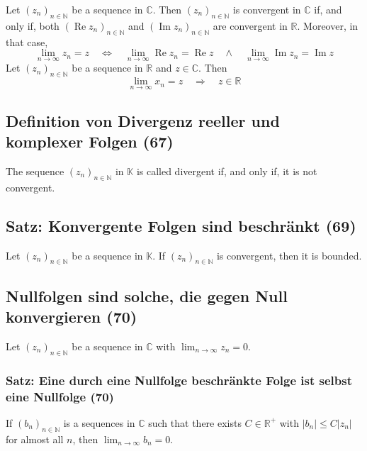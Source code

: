 Let $(z _ { n }) _ { n \in \mathbb { N } }$ be a sequence in $\mathbb{C}$. Then $(z _ { n }) _ { n \in \mathbb { N } }$ is convergent in $\mathbb{C}$
if, and only if, both $(\operatorname{Re}z _ { n }) _ { n \in \mathbb { N } }$ and $(\operatorname{Im}z _ { n }) _ { n \in \mathbb { N } }$ are convergent in $\mathbb{R}$. Moreover, in
that case,
\begin{equation}
\lim _ { n \rightarrow \infty } z _ { n } = z \quad \Leftrightarrow \quad \lim _ { n \rightarrow \infty } \operatorname{Re} z _ { n } = \operatorname{Re} z \quad \wedge \quad \lim  _ { n \rightarrow \infty } \operatorname{Im} z _ { n } = \operatorname{Im} z
\end{equation}
Let $(z _ { n }) _ { n \in \mathbb { N } }$ be a sequence in $\mathbb{R}$ and $z \in \mathbb{C}$. Then
\begin{equation}
\lim _ { n \rightarrow \infty } x _ { n } = z \quad \Rightarrow \quad z \in \mathbb { R }
\end{equation}

\subsection{Definition von Divergenz reeller und komplexer Folgen (67)}
The sequence $(z _ { n }) _ { n \in \mathbb { N } }$ in $\mathbb{K}$ is called divergent if, and only if, it is not convergent.

\subsection{Satz: Konvergente Folgen sind beschränkt (69)}
Let $(z _ { n }) _ { n \in \mathbb { N } }$ be a sequence in $\mathbb{K}$. If  $(z _ { n }) _ { n \in \mathbb { N } }$  is convergent, then it is bounded.

\subsection{Nullfolgen sind solche, die gegen Null konvergieren (70)}
Let $(z _ { n }) _ { n \in \mathbb { N } }$ be a sequence in $\mathbb{C}$ with $\lim _ { n \rightarrow \infty } z _ { n } = 0$.

\subsubsection{Satz: Eine durch eine Nullfolge beschränkte Folge ist selbst eine Nullfolge (70)}
If $(b _ { n }) _ { n \in \mathbb { N } }$ is a sequences in $\mathbb{C}$ such that there exists $C \in \mathbb { R } ^ { + }$ with $| b _ { n } | \leq C | z _ { n } |$ for
almost all $n$, then $\lim _ { n \rightarrow \infty } b _ { n } = 0$.

